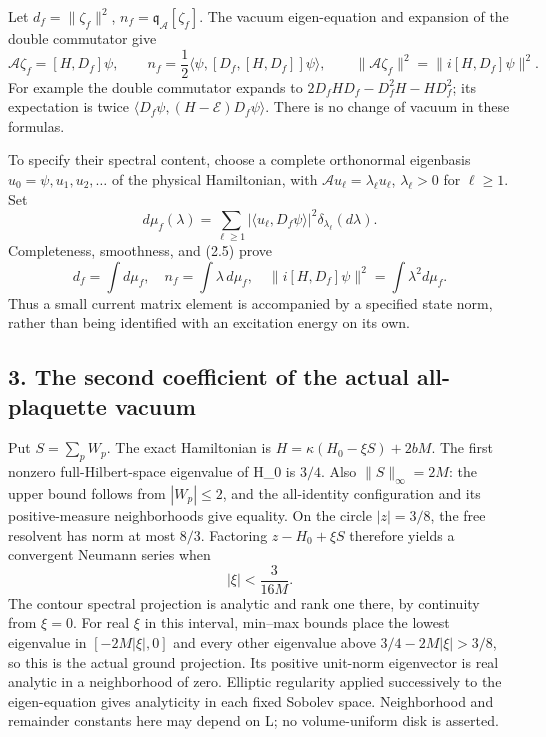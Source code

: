 \documentclass[
  11pt,
]{article}
\begin{document}
Let \(d_f=\|\zeta_f\|^2\), \(n_f=\mathfrak q_{\mathcal A}[\zeta_f]\).
The vacuum eigen-equation and expansion of the double commutator give \[
 \mathcal A\zeta_f=[H,D_f]\psi,\qquad
 n_f=\frac12\langle\psi,[D_f,[H,D_f]]\psi\rangle,
 \qquad
 \|\mathcal A\zeta_f\|^2=\|i[H,D_f]\psi\|^2.
\tag{2.5}
\] For example the double commutator expands to
\(2D_fHD_f-D_f^2H-HD_f^2\); its expectation is twice
\(\langle D_f\psi,(H-\mathcal E)D_f\psi\rangle\). There is no change of
vacuum in these formulas.

To specify their spectral content, choose a complete orthonormal
eigenbasis \(u_0=\psi,u_1,u_2,\ldots\) of the physical Hamiltonian, with
\(\mathcal A u_\ell=\lambda_\ell u_\ell\), \(\lambda_\ell>0\) for
\(\ell\ge1\). Set \[
 d\mu_f(\lambda)=\sum_{\ell\ge1}
 |\langle u_\ell,D_f\psi\rangle|^2\delta_{\lambda_\ell}(d\lambda).
\] Completeness, smoothness, and (2.5) prove \[
 d_f=\int d\mu_f,\quad n_f=\int\lambda\,d\mu_f,\quad
 \|i[H,D_f]\psi\|^2=\int\lambda^2d\mu_f.
\tag{2.6}
\] Thus a small current matrix element is accompanied by a specified
state norm, rather than being identified with an excitation energy on
its own.

\subsection{3. The second coefficient of the actual all-plaquette
vacuum}\label{magnetic-part-3-the-second-coefficient-of-the-actual-all-plaquette-vacuum}

Put \(S=\sum_pW_p\). The exact Hamiltonian is
\(H=\kappa(H_0-\xi S)+2bM\). The first nonzero full-Hilbert-space
eigenvalue of H\_0 is \(3/4\). Also \(\|S\|_\infty=2M\): the upper bound
follows from \(|W_p|\le2\), and the all-identity configuration and its
positive-measure neighborhoods give equality. On the circle \(|z|=3/8\),
the free resolvent has norm at most \(8/3\). Factoring \(z-H_0+\xi S\)
therefore yields a convergent Neumann series when \[
 |\xi|<\frac{3}{16M}.
\tag{3.1}
\] The contour spectral projection is analytic and rank one there, by
continuity from \(\xi=0\). For real \(\xi\) in this interval, min--max
bounds place the lowest eigenvalue in \([-2M|\xi|,0]\) and every other
eigenvalue above \(3/4-2M|\xi|>3/8\), so this is the actual ground
projection. Its positive unit-norm eigenvector is real analytic in a
neighborhood of zero. Elliptic regularity applied successively to the
eigen-equation gives analyticity in each fixed Sobolev space.
Neighborhood and remainder constants here may depend on L; no
volume-uniform disk is asserted.
\end{document}
